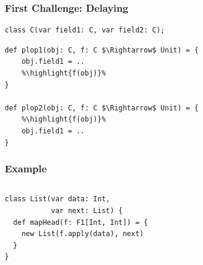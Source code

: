 \documentclass[hyperref={pdfpagelabels=false}]{beamer}
\newcommand\highlight[1]{\color{red}{#1}}
\begin{document}
\begin{frame}[fragile]
\frametitle{First Challenge: Delaying}
\begin{lstlisting}[escapechar=\%]
class C(var field1: C, var field2: C);
\end{lstlisting}

\begin{lstlisting}[escapechar=\%]
def plop1(obj: C, f: C $\Rightarrow$ Unit) = {
    obj.field1 = ..
    %\highlight{f(obj)}%
}

def plop2(obj: C, f: C $\Rightarrow$ Unit) = {
    %\highlight{f(obj)}%
    obj.field1 = ..
}
\end{lstlisting}
    \begin{figure}
    \end{figure}
\end{frame}
\begin{frame}[fragile]
\frametitle{Example}
  \begin{columns}
    \begin{column}{0.4\textwidth}
\begin{lstlisting}[escapechar=\%]
class List(var data: Int,
           var next: List) {
  def mapHead(f: F1[Int, Int]) = {
    new List(f.apply(data), next)
  }
}
\end{lstlisting}
    \end{column}
    \begin{column}{0.6\textwidth}
      \begin{figure}[t]
      \end{figure}
    \end{column}
  \end{columns}
\end{frame}
\end{document}
